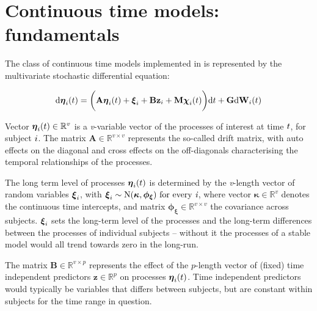 \documentclass[nojss]{jss}\usepackage[]{graphicx}\usepackage[]{color}
\begin{document}
\section{Continuous time models: fundamentals}\label{sec:formalspec}\nopagebreak
The class of continuous time models implemented in  is represented by the multivariate stochastic differential equation:

\begin{equation}
\label{eq:process1}
\mathrm{  d \boldsymbol{\eta}_\mathnormal{i} \mathnormal{(t)} =
\bigg( \textbf{A} \boldsymbol{\eta}_\mathnormal{i} ( \mathnormal{t} ) +
\boldsymbol{\xi}_\mathnormal{i} +
\mathbf{Bz}_\mathnormal{i} +
\mathbf{M}\boldsymbol{\chi}_\mathnormal{i} ( \mathnormal{t} )  \bigg) d \mathnormal{t} +
\textbf{G} d \textbf{W}_\mathnormal{i}(\mathnormal{t})  }
\end{equation}


Vector $\boldsymbol{\eta}_\mathnormal{i}(\mathnormal{t})\in\mathbb{R}^{v}$ is a \textit{v}-variable vector of the processes of interest at time $\mathnormal{t}$, for subject $\mathnormal{i}$. The matrix $\textbf{A}\in \mathbb{R}^{v \times v}$ represents the so-called drift matrix, with auto effects on the diagonal and cross effects on the off-diagonals characterising the temporal relationships of the processes. 

The long term  level of processes $\boldsymbol{\eta}_\mathnormal{i}(\mathnormal{t})$ is determined by the \textit{v}-length vector of random variables $\boldsymbol{\xi}_\mathnormal{i}$, with $\boldsymbol{\xi}_\mathnormal{i}\sim \mathrm{N}(\boldsymbol{\kappa}, \boldsymbol{\phi_\xi}) \textnormal{ for every } \textit{i}$, where vector $\boldsymbol{\kappa}\in \mathbb{R}^{v}$ denotes the continuous time intercepts, and matrix $\boldsymbol{\phi_\xi}\in \mathbb{R}^{v \times v}$ the covariance across subjects. $\boldsymbol{\xi}_\mathnormal{i}$ sets the long-term level of the processes and the long-term differences between the processes of individual subjects -- without it the processes of a stable model would all trend towards zero in the long-run.

The matrix $\textbf{B}\in \mathbb{R}^{v \times p}$ represents the effect of the $p$-length vector of (fixed) time independent predictors $\textbf{z}\in\mathbb{R}^{p}$ on processes $\boldsymbol{\eta}_\mathnormal{i}(\mathnormal{t})$. Time independent predictors would typically be variables that differs between subjects, but are constant within subjects for the time range in question.
\end{document}
